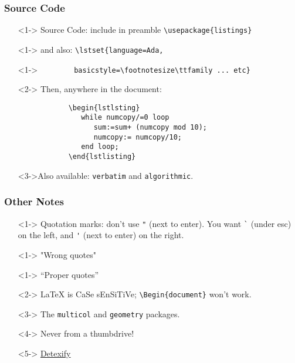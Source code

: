 \begin{frame}[fragile]
\frametitle{Source Code}

\begin{itemize}
	\item[]<1-> Source Code: include in preamble \verb|\usepackage{listings}|
	\item[]<1-> and also: \verb|\lstset{language=Ada, | \vspace{-14pt}
	\item[]<1-> \verb|        basicstyle=\footnotesize\ttfamily ... etc}|
	\item[]<2-> Then, anywhere in the document:
		\begin{verbatim}
			\begin{lstlsting}
			   while numcopy/=0 loop
			      sum:=sum+ (numcopy mod 10);
			      numcopy:= numcopy/10;
			   end loop;
			\end{lstlisting}
		\end{verbatim}
	\item[]<3->Also available: \verb|verbatim| and \verb|algorithmic|.
\end{itemize}
\end{frame}

\begin{frame}[fragile]
\frametitle{Other Notes}
\begin{itemize}
	\item[]<1-> Quotation marks: don't use \verb|"| (next to enter). You want \verb|`| (under esc) on the left, and \verb|'| (next to enter) on the right.
	\item[]<1-> "Wrong quotes"
	\item[]<1-> ``Proper quotes''
	\item[]<2-> \LaTeX{} is CaSe sEnSiTiVe; \verb|\Begin{document}| won't work.
	\item[]<3-> The \verb|multicol| and \verb|geometry| packages.
	\item[]<4-> Never from a thumbdrive!
	\item[]<5-> \href{http://detexify.kirelabs.org/classify.html}{Detexify}
\end{itemize}
\end{frame}

